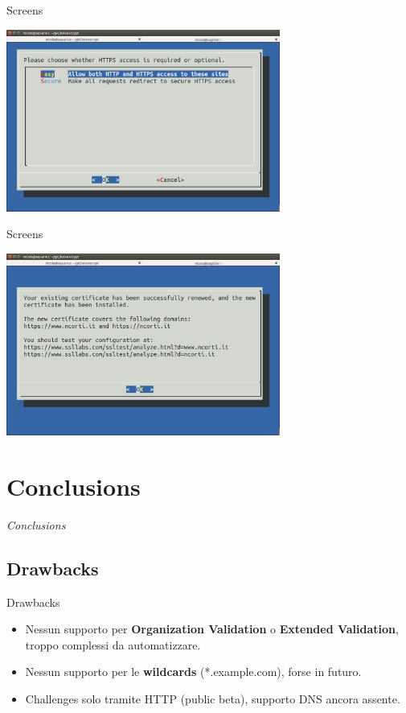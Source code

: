 \documentclass[xcolor=svgnames,11pt]{beamer}
\begin{document}
\begin{frame}{Screens}
\begin{center}
\includegraphics[width=9cm]{img/screen7.png}
\end{center}
\end{frame}
\begin{frame}{Screens}
\begin{center}
\includegraphics[width=9cm]{img/screen8.png}
\end{center}
\end{frame}


\section{Conclusions}
\begin{frame}{}
\begin{center}
\begin{Huge}
\textcolor{leorange}{\emph{Conclusions}}
\end{Huge}
\end{center}
\end{frame}



\subsection{Drawbacks}
\begin{frame}{Drawbacks}
\begin{itemize}
  \item Nessun supporto per \textbf{Organization Validation} o \textbf{Extended
  Validation}, troppo complessi da automatizzare.
  \medskip\pause
  \item Nessun supporto per le \textbf{wildcards} (*.example.com), forse in futuro.
  \medskip\pause
  \item Challenges solo tramite HTTP (public beta), supporto DNS ancora assente.
\end{itemize}
\end{frame}
\end{document}
